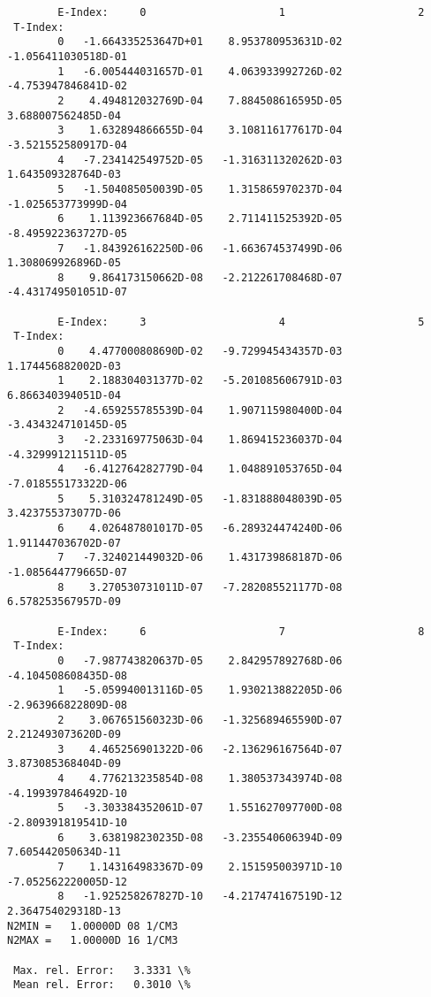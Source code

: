\documentclass[12pt,dvipdfmx]{article}
\begin{document}
{\begin{small}\begin{verbatim}
        E-Index:     0                     1                     2
 T-Index:
        0   -1.664335253647D+01    8.953780953631D-02   -1.056411030518D-01
        1   -6.005444031657D-01    4.063933992726D-02   -4.753947846841D-02
        2    4.494812032769D-04    7.884508616595D-05    3.688007562485D-04
        3    1.632894866655D-04    3.108116177617D-04   -3.521552580917D-04
        4   -7.234142549752D-05   -1.316311320262D-03    1.643509328764D-03
        5   -1.504085050039D-05    1.315865970237D-04   -1.025653773999D-04
        6    1.113923667684D-05    2.711411525392D-05   -8.495922363727D-05
        7   -1.843926162250D-06   -1.663674537499D-06    1.308069926896D-05
        8    9.864173150662D-08   -2.212261708468D-07   -4.431749501051D-07

        E-Index:     3                     4                     5
 T-Index:
        0    4.477000808690D-02   -9.729945434357D-03    1.174456882002D-03
        1    2.188304031377D-02   -5.201085606791D-03    6.866340394051D-04
        2   -4.659255785539D-04    1.907115980400D-04   -3.434324710145D-05
        3   -2.233169775063D-04    1.869415236037D-04   -4.329991211511D-05
        4   -6.412764282779D-04    1.048891053765D-04   -7.018555173322D-06
        5    5.310324781249D-05   -1.831888048039D-05    3.423755373077D-06
        6    4.026487801017D-05   -6.289324474240D-06    1.911447036702D-07
        7   -7.324021449032D-06    1.431739868187D-06   -1.085644779665D-07
        8    3.270530731011D-07   -7.282085521177D-08    6.578253567957D-09

        E-Index:     6                     7                     8
 T-Index:
        0   -7.987743820637D-05    2.842957892768D-06   -4.104508608435D-08
        1   -5.059940013116D-05    1.930213882205D-06   -2.963966822809D-08
        2    3.067651560323D-06   -1.325689465590D-07    2.212493073620D-09
        3    4.465256901322D-06   -2.136296167564D-07    3.873085368404D-09
        4    4.776213235854D-08    1.380537343974D-08   -4.199397846492D-10
        5   -3.303384352061D-07    1.551627097700D-08   -2.809391819541D-10
        6    3.638198230235D-08   -3.235540606394D-09    7.605442050634D-11
        7    1.143164983367D-09    2.151595003971D-10   -7.052562220005D-12
        8   -1.925258267827D-10   -4.217474167519D-12    2.364754029318D-13
N2MIN =   1.00000D 08 1/CM3
N2MAX =   1.00000D 16 1/CM3

 Max. rel. Error:   3.3331 \%
 Mean rel. Error:   0.3010 \%



\end{verbatim}
\end{small}}
\end{document}
